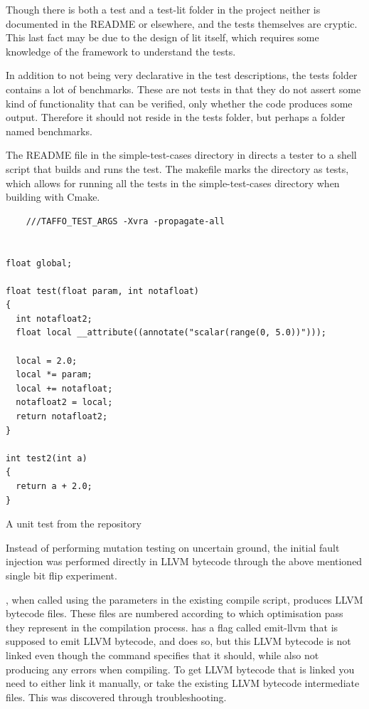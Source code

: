 Though there is both a test and a test-lit folder in the \taffo{} project neither is documented in the README or elsewhere, and the tests themselves are cryptic. This last fact may be due to the design of lit itself, which requires some knowledge of the framework to understand the tests. 

In addition to not being very declarative in the test descriptions, the tests folder contains a lot of benchmarks. These are not tests in that they do not assert some kind of functionality that can be verified, only whether the code produces \*some\* output. Therefore it should not reside in the tests folder, but perhaps a folder named benchmarks.

The README file in the simple-test-cases directory in \taffo{} directs a tester to a shell script that builds and runs the test. The makefile marks the directory as tests, which allows for running all the tests in the simple-test-cases directory when building \taffo{} with Cmake.

\begin{lstlisting}
    ///TAFFO_TEST_ARGS -Xvra -propagate-all


float global;

float test(float param, int notafloat)
{
  int notafloat2;
  float local __attribute((annotate("scalar(range(0, 5.0))")));
  
  local = 2.0;
  local *= param;
  local += notafloat;
  notafloat2 = local;
  return notafloat2;
}

int test2(int a)
{
  return a + 2.0;
}

\end{lstlisting}
\label{listing:taffo_unit_test}
\caption{A unit test from the \taffo{} repository}

Instead of performing mutation testing on uncertain ground, the initial fault injection was performed directly in LLVM bytecode through the above mentioned single bit flip experiment.

\taffo{}, when called using the parameters in the existing compile script, produces LLVM bytecode files. These files are numbered according to which optimisation pass they represent in the \taffo{} compilation process. \taffo{} has a flag called emit-llvm that is supposed to emit LLVM bytecode, and does so, but this LLVM bytecode is not linked even though the \taffo{} command specifies that it should, while also not producing any errors when compiling. To get LLVM bytecode that is linked you need to either link it manually, or take the existing LLVM bytecode intermediate files. This was discovered through troubleshooting. 


